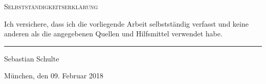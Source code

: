 \begin{declaration}
	
	\textsc{\huge Selbstständigkeitserklärung }\\[0.9cm] %
	
	\vspace{4.0cm}
	
	\noindent Ich versichere, dass ich die vorliegende Arbeit selbstst\"andig verfasst und keine anderen als die angegebenen Quellen und Hilfsmittel verwendet habe.
	\vspace{1.5cm}

	

		\begin{flushright}
		\noindent\rule{5cm}{.4pt}\par
		Sebastian Schulte\par
		M\"unchen, den 09. Februar 2018\par
	\end{flushright}
	
\end{declaration}






